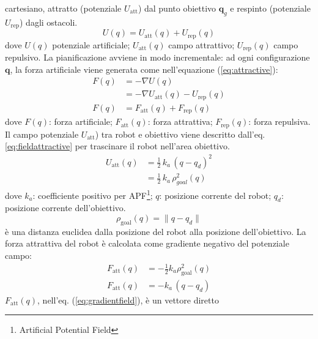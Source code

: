 cartesiano, attratto (potenziale $U_{\text{att}}$) dal punto obiettivo
$\mathbf{q}_g$ e respinto (potenziale $U_{\text{rep}}$) dagli ostacoli.
\begin{equation}
\label{eq:apfm}
U(q) = U_{\text{att}}(q) + U_{\text{rep}}(q)
\end{equation}
%
\noindent dove $U(q)$ potenziale artificiale; $U_{\text{att}}(q)$ campo
attrattivo; $U_{\text{rep}}(q)$ campo repulsivo.
La pianificazione avviene in modo incrementale: ad ogni configurazione
$\mathbf{q}$, la forza artificiale viene generata come nell'equazione (\ref{eq:attractive}):
\begin{equation}
\label{eq:attractive}
\begin{split}
F(q) &= - \nabla U(q)\\
&= - \nabla U_{\text{att}}(q) -U_{\text{rep}}(q)\\
F(q) &= F_{\text{att}}(q) + F_{\text{rep}}(q)
\end{split}
\end{equation}
dove $F(q)$: forza artificiale; $F_{\text{att}}(q)$: forza attrattiva;
$F_{\text{rep}}(q)$: forza repulsiva. Il campo potenziale $U_{\text{att}}$) tra
robot e obiettivo viene descritto dall'eq. \eqref{eq:fieldattractive} per 
trascinare il robot nell'area obiettivo.
\begin{equation}
\label{eq:fieldattractive}
\begin{split}
U_{\text{att}}(q) &= \frac{1}{2} \, k_a \, (q-q_d)^2\\
&= \frac{1}{2} \, k_a \, \rho^{2}_{goal}(q)
\end{split}
\end{equation}
dove $k_a$: coefficiente positivo per APF\footnote{Artificial Potential Field};
$q$: posizione corrente del robot; $q_{d}$: posizione corrente dell'obiettivo.
\begin{equation}
  \rho_{\text{goal}}(q) = \|q-q_{d}\|
\end{equation}
è una distanza euclidea dalla posizione del robot alla posizione dell'obiettivo.
La forza attrattiva del robot è calcolata come gradiente negativo del potenziale
campo\cite{6283526}:
\begin{equation}
\label{eq:gradientfield}
\begin{split}
F_{\text{att}}(q) &= -\frac{1}{2}k_a \rho^2_{\text{goal}}(q)\\
F_{\text{att}}(q) &= -k_a \, (q-q_d)
\end{split}
\end{equation}
%
$F_{\text{att}}(q)$, nell'eq. (\ref{eq:gradientfield}), è un vettore diretto
